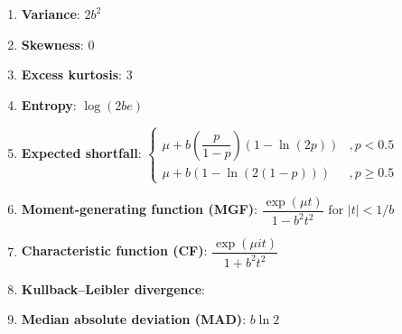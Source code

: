\begin{enumerate}
    \item \textbf{Variance}: $ {\displaystyle 2b^{2}}$
    \hfill \cite{wiki/Laplace_distribution}

    \item \textbf{Skewness}: $ {\displaystyle 0}$
    \hfill \cite{wiki/Laplace_distribution}

    \item \textbf{Excess kurtosis}: $  {\displaystyle 3} $
    \hfill \cite{wiki/Laplace_distribution}

    \item \textbf{Entropy}: $  {\displaystyle \log(2be)} $
    \hfill \cite{wiki/Laplace_distribution}


    \item \textbf{Expected shortfall}:
    $ {\displaystyle {\begin{cases}\mu +b\left({\dfrac {p}{1-p}}\right)(1-\ln(2p))&,p<0.5\\\mu +b\left(1-\ln \left(2(1-p)\right)\right)&,p\geq 0.5\end{cases}}}$
    \hfill \cite{wiki/Laplace_distribution}

    \item \textbf{Moment-generating function (MGF)}: 
    $ {\displaystyle {\dfrac {\exp(\mu t)}{1-b^{2}t^{2}}}{\text{ for }}|t|<1/b}$
    \hfill \cite{wiki/Laplace_distribution}

    \item \textbf{Characteristic function (CF)}:
    $ {\displaystyle {\dfrac {\exp(\mu it)}{1+b^{2}t^{2}}}}$
    \hfill \cite{wiki/Laplace_distribution}

    \item \textbf{Kullback–Leibler divergence}:
    $ $
    \hfill \cite{wiki/Laplace_distribution}

    \item \textbf{Median absolute deviation (MAD)}:
    $ {\displaystyle b\ln 2}$
    \hfill \cite{wiki/Laplace_distribution}
\end{enumerate}











